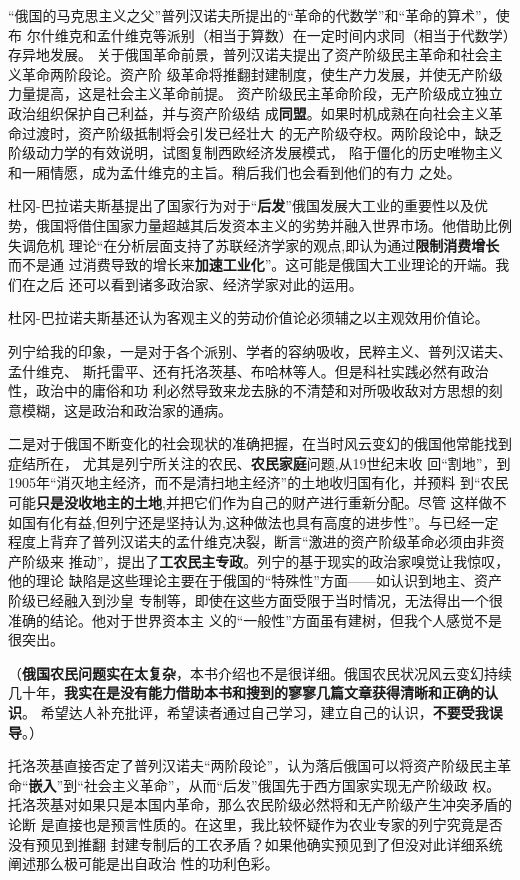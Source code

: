 “俄国的马克思主义之父”普列汉诺夫所提出的“革命的代数学”和“革命的算术”，使布
尔什维克和孟什维克等派别（相当于算数）在一定时间内求同（相当于代数学）存异地发展。
关于俄国革命前景，普列汉诺夫提出了资产阶级民主革命和社会主义革命两阶段论。资产阶
级革命将推翻封建制度，使生产力发展，并使无产阶级力量提高，这是社会主义革命前提。
资产阶级民主革命阶段，无产阶级成立独立政治组织保护自己利益，并与资产阶级结
成\textbf{同盟}。如果时机成熟在向社会主义革命过渡时，资产阶级抵制将会引发已经壮大
的无产阶级夺权。两阶段论中，缺乏阶级动力学的有效说明，试图复制西欧经济发展模式，
陷于僵化的历史唯物主义和一厢情愿，成为孟什维克的主旨。稍后我们也会看到他们的有力
之处。

杜冈-巴拉诺夫斯基提出了国家行为对于“\textbf{后发}”俄国发展大工业的重要性以及优
势，俄国将借住国家力量超越其后发资本主义的劣势并融入世界市场。他借助比例失调危机
理论“在分析层面支持了苏联经济学家的观点,即认为通过\textbf{限制消费增长}而不是通
过消费导致的增长来\textbf{加速工业化}”。这可能是俄国大工业理论的开端。我们在之后
还可以看到诸多政治家、经济学家对此的运用。

杜冈-巴拉诺夫斯基还认为客观主义的劳动价值论必须辅之以主观效用价值论。

列宁给我的印象，一是对于各个派别、学者的容纳吸收，民粹主义、普列汉诺夫、孟什维克、
斯托雷平、还有托洛茨基、布哈林等人。但是科社实践必然有政治性，政治中的庸俗和功
利必然导致来龙去脉的不清楚和对所吸收敌对方思想的刻意模糊，这是政治和政治家的通病。

二是对于俄国不断变化的社会现状的准确把握，在当时风云变幻的俄国他常能找到症结所在，
尤其是列宁所关注的农民、\textbf{农民家庭}问题,从19世纪末收
回“割地”，到1905年“消灭地主经济，而不是清扫地主经济”的土地收归国有化，并预料
到“农民可能\textbf{只是没收地主的土地},并把它们作为自己的财产进行重新分配。尽管
这样做不如国有化有益,但列宁还是坚持认为,这种做法也具有高度的进步性”。与已经一定
程度上背弃了普列汉诺夫的孟什维克决裂，断言“激进的资产阶级革命必须由非资产阶级来
推动”，提出了\textbf{工农民主专政}。列宁的基于现实的政治家嗅觉让我惊叹，他的理论
缺陷是这些理论主要在于俄国的“特殊性”方面——如认识到地主、资产阶级已经融入到沙皇
专制等，即使在这些方面受限于当时情况，无法得出一个很准确的结论。他对于世界资本主
义的“一般性”方面虽有建树，但我个人感觉不是很突出。

（\textbf{俄国农民问题实在太复杂}，本书介绍也不是很详细。俄国农民状况风云变幻持续
几十年，\textbf{我实在是没有能力借助本书和搜到的寥寥几篇文章获得清晰和正确的认识}。
希望达人补充批评，希望读者通过自己学习，建立自己的认识，\textbf{不要受我误导}。）

托洛茨基直接否定了普列汉诺夫“两阶段论”，认为落后俄国可以将资产阶级民主革
命“\textbf{嵌入}”到“社会主义革命”，从而“后发”俄国先于西方国家实现无产阶级政
权。托洛茨基对如果只是本国内革命，那么农民阶级必然将和无产阶级产生冲突矛盾的论断
是直接也是预言性质的。在这里，我比较怀疑作为农业专家的列宁究竟是否没有预见到推翻
封建专制后的工农矛盾？如果他确实预见到了但没对此详细系统阐述那么极可能是出自政治
性的功利色彩。

